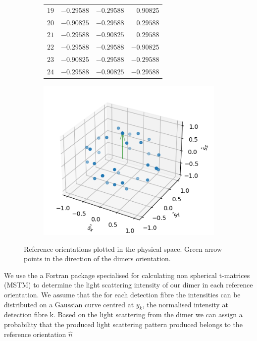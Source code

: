 \documentclass[11pt]{article}
\begin{document}
\begin{figure}
\begin{subfigure}{0.45\textwidth}
\begin{tabular}{rrrr}
				$19$ & $-0.29588$ &  $-0.29588$ & $ 0.90825$ \\
				$20$ & $-0.90825$ &  $-0.29588$ & $ 0.29588$ \\
				$21$ & $-0.29588$ &  $-0.90825$ & $ 0.29588$ \\
				$22$ & $-0.29588$ &  $-0.29588$ & $-0.90825$ \\
				$23$ & $-0.90825$ &  $-0.29588$ & $-0.29588$ \\
				$24$ & $-0.29588$ &  $-0.90825$ & $-0.29588$ \\
				\hline\hline
			\end{tabular}
	\end{subfigure}
	\begin{subfigure}{0.45\textwidth}
		\includegraphics[width=1.35\textwidth]{junk_00000.png}
	\end{subfigure}
\caption{Reference orientations plotted in the physical space. Green arrow points in the direction of the dimers orientation.}
\end{figure}

We use the a Fortran package specialised for calculating non spherical t-matrices (MSTM) \cite{6} to determine the light scattering intensity of our dimer in each reference orientation. We assume that the for each detection fibre the intensities can be distributed on a Gaussian curve centred at $y_k$, the normalised intensity at detection fibre k. Based on the light scattering from the dimer we can assign a probability that the produced light scattering pattern produced belongs to the reference orientation $\hat{n}$
\end{document}
